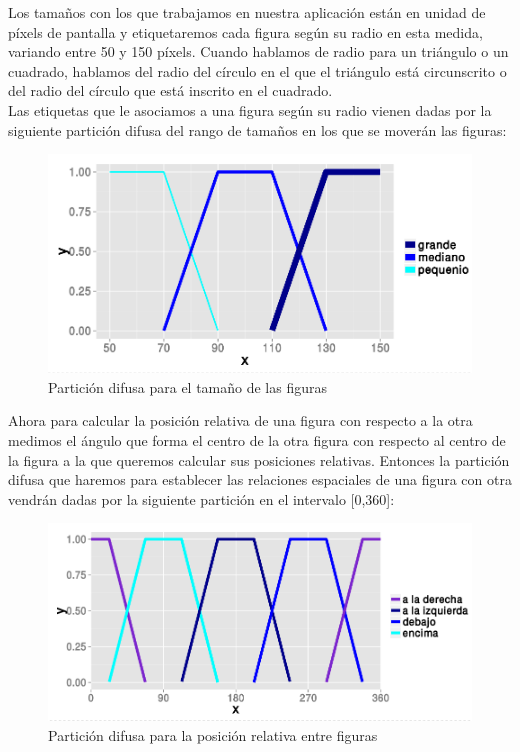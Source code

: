 \documentclass[10pt,a4paper]{article}
\begin{document}
Los tamaños con los que trabajamos en nuestra aplicación están en unidad de píxels de pantalla y etiquetaremos cada figura según su radio en esta medida, variando entre 50 y 150 píxels. Cuando hablamos de radio para un triángulo o un cuadrado, hablamos del radio del círculo en el que el triángulo está circunscrito o del radio del círculo que está inscrito en el cuadrado.\\

Las etiquetas que le asociamos a una figura según su radio vienen dadas por la siguiente partición difusa del rango de tamaños en los que se moverán las figuras:

\begin{figure}[H]
\centering
\includegraphics[width = \textwidth]{img/partitionTam.png}
\caption{Partición difusa para el tamaño de las figuras}
\end{figure}

Ahora para calcular la posición relativa de una figura con respecto a la otra medimos el ángulo que forma el centro de la otra figura con respecto al centro de la figura a la que queremos calcular sus posiciones relativas. Entonces la partición difusa que haremos para establecer las relaciones espaciales de una figura con otra vendrán dadas por la siguiente partición en el intervalo [0,360]:\\

\begin{figure}[H]
\centering
\includegraphics[width = \textwidth]{img/partitionRelPos.png}
\caption{Partición difusa para la posición relativa entre figuras}
\end{figure}
\end{document}

